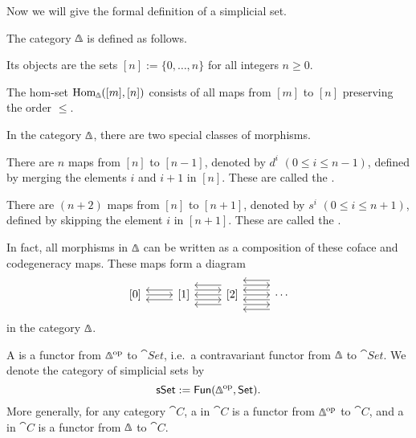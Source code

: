 Now we will give the formal definition of a simplicial set.

\begin{definition}
    The category $\bfDelta$ is defined as follows.
    \begin{itms}
        \item Its objects are the sets $[n]:=\{0,\dotsc,n\}$ for all integers $n\geq0$.
        \item The hom-set $\Hom_\bfDelta([m],[n])$ consists of all maps from $[m]$ to $[n]$
              preserving the order $\leq$.
    \end{itms}
\end{definition}

In the category $\bfDelta$, there are two special classes of morphisms.
\begin{itms}
    \item There are $n$ maps from $[n]$ to $[n-1]$,
    denoted by $d^i$ $(0\leq i\leq n-1)$,
    defined by merging the elements $i$ and $i+1$ in $[n]$.
    These are called the .
    \item There are $(n+2)$ maps from $[n]$ to $[n+1]$,
    denoted by $s^i$ $(0\leq i\leq n+1)$,
    defined by skipping the element $i$ in $[n+1]$.
    These are called the .
\end{itms}
In fact, all morphisms in $\bfDelta$
can be written as a composition of these coface and codegeneracy maps.
These maps form a diagram
\[\begin{tikzcd}
    \relax[0]\ar[r] &
    \relax[1]\ar[l,shift left=1ex]\ar[l,shift right=1ex]\ar[r,shift left=1ex]\ar[r,shift right=1ex] &
    \relax[2]\ar[l,shift left=2ex]\ar[l]\ar[l,shift right=2ex]\ar[r,shift left=2ex]\ar[r]\ar[r,shift right=2ex] &
    \cdots\ar[l,shift left=3ex]\ar[l,shift left=1ex]\ar[l,shift right=1ex]\ar[l,shift right=3ex]
\end{tikzcd}\]
in the category $\bfDelta$.

\begin{definition}
    A  is a functor from $\bfDelta\op$ to $\cat{Set}$,
    i.e.\ a contravariant functor from $\bfDelta$ to $\cat{Set}$.
    We denote the category of simplicial sets by
    \[\cat{sSet}:=\cat{Fun}(\bfDelta\op,\cat{Set}).\]
    More generally, for any category $\cat C$,
    a  in $\cat C$ is a functor from $\bfDelta\op$ to $\cat{C}$,
    and a  in $\cat C$ is a functor from $\bfDelta$ to $\cat{C}$.
\end{definition}

